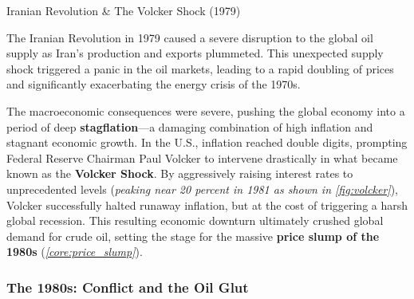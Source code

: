 \documentclass[10pt]{article}
\begin{document}
      \begin{core}[label=core:volcker]{Iranian Revolution \& The Volcker Shock (1979)}

        The Iranian Revolution in 1979 caused a severe disruption to the global oil supply as Iran's production and exports plummeted. This unexpected supply shock triggered a panic in the oil markets, leading to a rapid doubling of prices and significantly exacerbating the energy crisis of the 1970s. 


        The macroeconomic consequences were severe, pushing the global economy into a period of deep \textbf{stagflation}---a damaging combination of high inflation and stagnant economic growth. In the U.S., inflation reached double digits, prompting Federal Reserve Chairman Paul Volcker to intervene drastically in what became known as the \textbf{Volcker Shock}. By aggressively raising interest rates to unprecedented levels (\textit{peaking near 20 percent in 1981 as shown in \autoref{fig:volcker}}), Volcker successfully halted runaway inflation, but at the cost of triggering a harsh global recession. This resulting economic downturn ultimately crushed global demand for crude oil, setting the stage for the massive \textbf{price slump of the 1980s} (\textit{\autoref{core:price_slump}}).


      \end{core}

    \subsubsection{The 1980s: Conflict and the Oil Glut}
\end{document}
